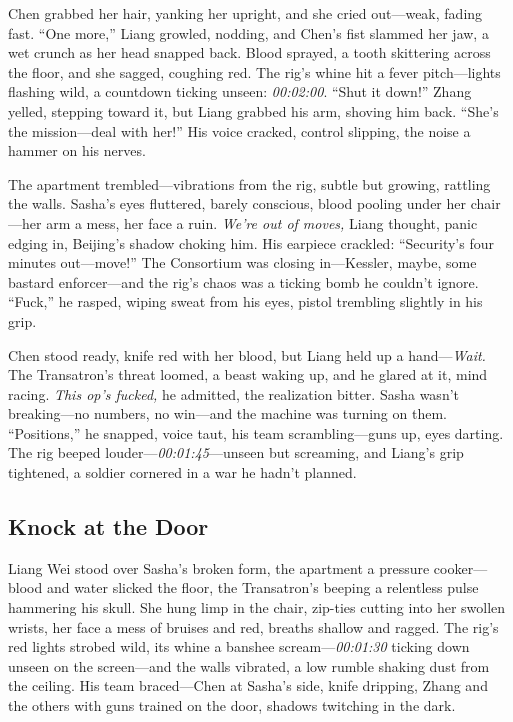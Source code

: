 \documentclass[12pt]{book}
\begin{document}
Chen grabbed her hair, yanking her upright, and she cried out—weak, fading fast. “One more,” Liang growled, nodding, and Chen’s fist slammed her jaw, a wet crunch as her head snapped back. Blood sprayed, a tooth skittering across the floor, and she sagged, coughing red. The rig’s whine hit a fever pitch—lights flashing wild, a countdown ticking unseen: \textit{00:02:00}. “Shut it down!” Zhang yelled, stepping toward it, but Liang grabbed his arm, shoving him back. “She’s the mission—deal with her!” His voice cracked, control slipping, the noise a hammer on his nerves.

The apartment trembled—vibrations from the rig, subtle but growing, rattling the walls. Sasha’s eyes fluttered, barely conscious, blood pooling under her chair—her arm a mess, her face a ruin. \textit{We’re out of moves,} Liang thought, panic edging in, Beijing’s shadow choking him. His earpiece crackled: “Security’s four minutes out—move!” The Consortium was closing in—Kessler, maybe, some bastard enforcer—and the rig’s chaos was a ticking bomb he couldn’t ignore. “Fuck,” he rasped, wiping sweat from his eyes, pistol trembling slightly in his grip.

Chen stood ready, knife red with her blood, but Liang held up a hand—\textit{Wait.} The Transatron’s threat loomed, a beast waking up, and he glared at it, mind racing. \textit{This op’s fucked,} he admitted, the realization bitter. Sasha wasn’t breaking—no numbers, no win—and the machine was turning on them. “Positions,” he snapped, voice taut, his team scrambling—guns up, eyes darting. The rig beeped louder—\textit{00:01:45}—unseen but screaming, and Liang’s grip tightened, a soldier cornered in a war he hadn’t planned.

\subsection{Knock at the Door}

Liang Wei stood over Sasha’s broken form, the apartment a pressure cooker—blood and water slicked the floor, the Transatron’s beeping a relentless pulse hammering his skull. She hung limp in the chair, zip-ties cutting into her swollen wrists, her face a mess of bruises and red, breaths shallow and ragged. The rig’s red lights strobed wild, its whine a banshee scream—\textit{00:01:30} ticking down unseen on the screen—and the walls vibrated, a low rumble shaking dust from the ceiling. His team braced—Chen at Sasha’s side, knife dripping, Zhang and the others with guns trained on the door, shadows twitching in the dark.
\end{document}
